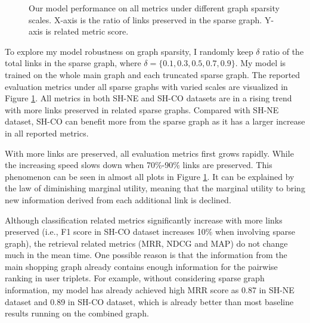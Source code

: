 \begin{figure}
	\caption{Our model performance on all metrics under different graph sparsity scales. X-axis is the ratio of links preserved in the sparse graph. Y-axis is related metric score.}
	\label{fig:sparsenss}
\end{figure}
To explore my model robustness on graph sparsity, I randomly keep $\delta$ ratio of the total links in the sparse graph, where  $\delta=\{0.1,0.3,0.5,0.7,0.9\}$. My model is trained on the whole main graph and each truncated sparse graph. The reported evaluation metrics under all sparse graphs with varied scales are visualized in Figure \ref{fig:sparsenss}. All metrics in both SH-NE and SH-CO datasets are in a rising trend with more links preserved in related sparse graphs. Compared with SH-NE dataset, SH-CO can benefit more from the sparse graph as it has a larger increase in all reported metrics. 

With more links are preserved, all evaluation metrics first grows rapidly. While the increasing speed slows down when 70\%-90\% links are preserved. This phenomenon can be seen in almost all plots in Figure \ref{fig:sparsenss}. It can be explained by the law of diminishing marginal utility, meaning that the marginal utility to bring new information derived from each additional link is declined.

Although classification related  metrics significantly increase with more links preserved (i.e., F1 score in SH-CO dataset increases 10\% when involving sparse graph), the retrieval related metrics (MRR, NDCG and MAP) do not change much in the mean time. One possible reason is that the information from the main shopping graph already contains enough information for the pairwise ranking in user triplets. For example, without considering sparse graph information, my model has already achieved high MRR score as 0.87 in SH-NE dataset and 0.89 in SH-CO dataset, which is already better than most baseline results running on the combined graph.


